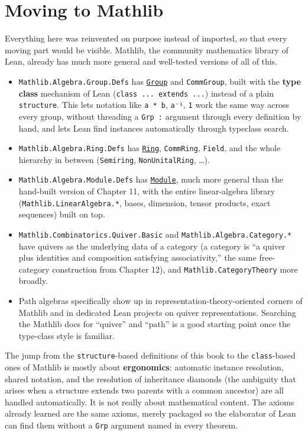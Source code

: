 \section{Moving to Mathlib}\label{sec:14-next-steps:02-moving-to-mathlib:1}

Everything here was reinvented on purpose instead of imported, so that every moving part would be visible. Mathlib, the community mathematics library of Lean, already has much more general and well-tested versions of all of this.

\begin{itemize}
\tightlist
\item
  \texttt{Mathlib.Algebra.Group.Defs} has \href{https://loogle.lean-lang.org/?q=Group}{\texttt{Group}} and \texttt{CommGroup}, built with the \textbf{type class} mechanism of Lean (\texttt{class ... extends ...}) instead of a plain \texttt{structure}. This lets notation like \texttt{a * b}, \texttt{a⁻¹}, \texttt{1} work the same way across every group, without threading a \texttt{Grp :} argument through every definition by hand, and lets Lean find instances automatically through typeclass search.
\item
  \texttt{Mathlib.Algebra.Ring.Defs} has \href{https://loogle.lean-lang.org/?q=Ring}{\texttt{Ring}}, \texttt{CommRing}, \texttt{Field}, and the whole hierarchy in between (\texttt{Semiring}, \texttt{NonUnitalRing}, \ldots).
\item
  \texttt{Mathlib.Algebra.Module.Defs} has \href{https://loogle.lean-lang.org/?q=Module}{\texttt{Module}}, much more general than the hand-built version of Chapter 11, with the entire linear-algebra library (\texttt{Mathlib.LinearAlgebra.*}, bases, dimension, tensor products, exact sequences) built on top.
\item
  \texttt{Mathlib.Combinatorics.Quiver.Basic} and \texttt{Mathlib.Algebra.Category.*} have quivers as the underlying data of a category (a category is ``a quiver plus identities and composition satisfying associativity,'' the same free-category construction from Chapter 12), and \texttt{Mathlib.CategoryTheory} more broadly.
\item
  Path algebras specifically show up in representation-theory-oriented corners of Mathlib and in dedicated Lean projects on quiver representations. Searching the Mathlib docs for ``quiver'' and ``path'' is a good starting point once the type-class style is familiar.
\end{itemize}

The jump from the \texttt{structure}-based definitions of this book to the \texttt{class}-based ones of Mathlib is mostly about \textbf{ergonomics}: automatic instance resolution, shared notation, and the resolution of inheritance diamonds (the ambiguity that arises when a structure extends two parents with a common ancestor) are all handled automatically. It is not really about mathematical content. The axioms already learned are the same axioms, merely packaged so the elaborator of Lean can find them without a \texttt{Grp} argument named in every theorem.

